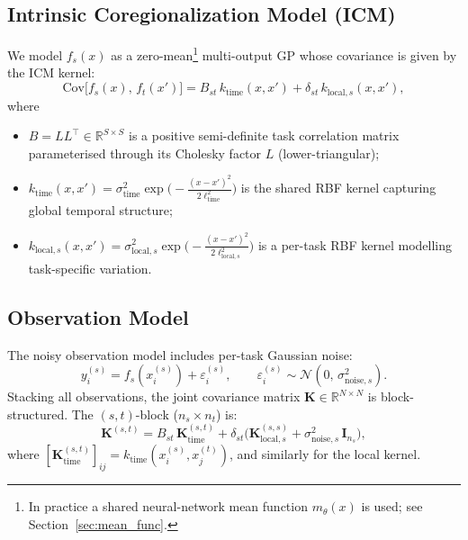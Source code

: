 \documentclass[11pt,a4paper]{article}
\newcommand{\R}{\mathbb{R}}
\newcommand{\N}{\mathcal{N}}
\begin{document}
\subsection{Intrinsic Coregionalization Model (ICM)}
We model $f_s(x)$ as a zero-mean\footnote{In practice a shared neural-network mean function $m_\theta(x)$ is used; see Section~\ref{sec:mean_func}.} multi-output GP whose covariance is given by the ICM kernel:
\begin{equation}\label{eq:icm_kernel}
  \mathrm{Cov}\!\bigl[f_s(x),\, f_t(x')\bigr]
  = B_{st}\, k_{\text{time}}(x,x')
  + \delta_{st}\, k_{\text{local},s}(x,x'),
\end{equation}
where
\begin{itemize}[nosep]
  \item $B = LL^\top \in \R^{S \times S}$ is a positive semi-definite task correlation matrix parameterised through its Cholesky factor $L$ (lower-triangular);
  \item $k_{\text{time}}(x,x') = \sigma_{\text{time}}^{2}\exp\!\bigl(-\tfrac{(x-x')^{2}}{2\ell_{\text{time}}^{2}}\bigr)$ is the shared RBF kernel capturing global temporal structure;
  \item $k_{\text{local},s}(x,x') = \sigma_{\text{local},s}^{2}\exp\!\bigl(-\tfrac{(x-x')^{2}}{2\ell_{\text{local},s}^{2}}\bigr)$ is a per-task RBF kernel modelling task-specific variation.
\end{itemize}

\subsection{Observation Model}
The noisy observation model includes per-task Gaussian noise:
\begin{equation}\label{eq:obs_model}
  y_i^{(s)} = f_s(x_i^{(s)}) + \varepsilon_i^{(s)},
  \qquad
  \varepsilon_i^{(s)} \sim \N(0,\,\sigma_{\text{noise},s}^{2}).
\end{equation}
Stacking all observations, the joint covariance matrix $\bm{K} \in \R^{N \times N}$ is block-structured. The $(s,t)$-block ($n_s \times n_t$) is:
\begin{equation}\label{eq:K_block}
  \bm{K}^{(s,t)} = B_{st}\, \bm{K}_{\text{time}}^{(s,t)}
  + \delta_{st}\bigl(\bm{K}_{\text{local},s}^{(s,s)} + \sigma_{\text{noise},s}^{2}\, \bm{I}_{n_s}\bigr),
\end{equation}
where $[\bm{K}_{\text{time}}^{(s,t)}]_{ij} = k_{\text{time}}(x_i^{(s)}, x_j^{(t)})$, and similarly for the local kernel.
\end{document}
